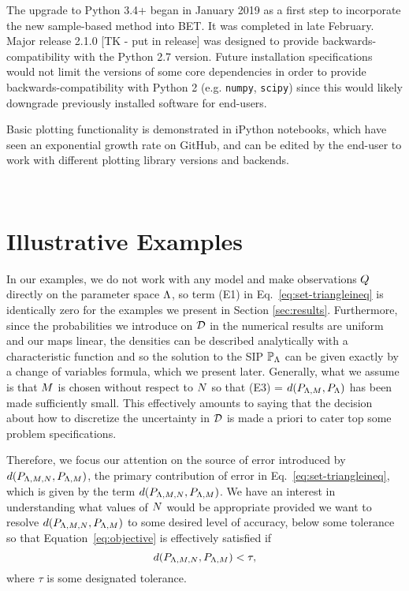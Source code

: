The upgrade to Python 3.4+ began in January 2019 as a first step to incorporate the new sample-based method into BET. 
It was completed in late February. 
Major release 2.1.0 [TK - put in release] was designed to provide backwards-compatibility with the Python 2.7 version. 
Future installation specifications would not limit the versions of some core dependencies in order to provide backwards-compatibility with Python 2 (e.g. {\tt numpy}, {\tt scipy}) since this would likely downgrade previously installed software for end-users. 

Basic plotting functionality is demonstrated in iPython notebooks, which have seen an exponential growth rate on GitHub, and can be edited by the end-user to work with different plotting library versions and backends.




\
\section{Illustrative Examples}\label{sec:ch02-examples}
In our examples, we do not work with any model and make observations $Q$ directly on the parameter space ${\Lambda}$, so term (E1) in Eq.~\eqref{eq:set-triangleineq} is identically zero for the examples we present in Section \ref{sec:results}.
Furthermore, since the probabilities we introduce on $\mathcal{D}$ in the numerical results are uniform and our maps linear, the densities can be described analytically with a characteristic function and so the solution to the SIP $\operatorname*{\mathbb{P}_{{\Lambda}}}$ can be given exactly by a change of variables formula, which we present later. 
Generally, what we assume is that $M$ is chosen without respect to $N$ so that (E3) = $d(P_{{\Lambda}, M}, P_{\Lambda})$ has been made sufficiently small. 
This effectively amounts to saying that the decision about how to discretize the uncertainty in $\mathcal{D}$ is made a priori to cater top some problem specifications. 

Therefore, we focus our attention on the source of error introduced by $d(P_{{\Lambda}, M, N}, P_{{\Lambda}, M} )$, the primary contribution of error in Eq.~\eqref{eq:set-triangleineq}, which is given by the term $d(P_{{\Lambda}, M, N}, P_{{\Lambda}, M})$.
We have an interest in understanding what values of $N$ would be appropriate provided we want to resolve $d(P_{{\Lambda}, M, N}, P_{{\Lambda}, M})$ to some desired level of accuracy, below some tolerance so that Equation~\eqref{eq:objective} is effectively satisfied if
\begin{equation}\label{eq:newobjective}
d(P_{{\Lambda}, M, N}, P_{{\Lambda},M}) < \tau,
\end{equation}
where $\tau$ is some designated tolerance.

